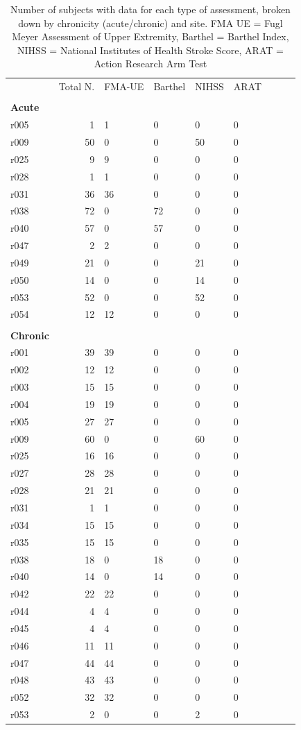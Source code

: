 \documentclass[10pt]{article}
\begin{document}
\begin{table}[h]
\centering
\caption{Number of subjects with data for each type of assessment, broken down by chronicity (acute/chronic) and site. FMA UE = Fugl Meyer Assessment of Upper Extremity, Barthel = Barthel Index, NIHSS = National Institutes of Health Stroke Score, ARAT = Action Research Arm Test}
\label{motor_scores}
\begin{tabular}{lrlllllll}
\toprule
 & Total N. & FMA-UE  & Barthel & NIHSS  & ARAT \\
 & & &  &  \\
 \textbf{Acute}  & & & & & \\
\midrule
r005 & 1 & 1 & 0 & 0 & 0 \\
r009 & 50 & 0 & 0 & 50 & 0 \\
r025 & 9 & 9 & 0 & 0 & 0 \\
r028 & 1 & 1 & 0 & 0 & 0 \\
r031 & 36 & 36 & 0 & 0 & 0 \\
r038 & 72 & 0 & 72 & 0 & 0 \\
r040 & 57 & 0 & 57 & 0 & 0 \\
r047 & 2 & 2 & 0 & 0 & 0 \\
r049 & 21 & 0 & 0 & 21 & 0 \\
r050 & 14 & 0 & 0 & 14 & 0 \\
r053 & 52 & 0 & 0 & 52 & 0 \\
r054 & 12 & 12 & 0 & 0 & 0 \\

& & & & & \\
 \textbf{Chronic}  & & & & & \\
\midrule
r001 & 39 & 39 & 0 & 0 & 0 \\
r002 & 12 & 12 & 0 & 0 & 0 \\
r003 & 15 & 15 & 0 & 0 & 0 \\
r004 & 19 & 19 & 0 & 0 & 0 \\
r005 & 27 & 27 & 0 & 0 & 0 \\
r009 & 60 & 0 & 0 & 60 & 0 \\
r025 & 16 & 16 & 0 & 0 & 0 \\
r027 & 28 & 28 & 0 & 0 & 0 \\
r028 & 21 & 21 & 0 & 0 & 0 \\
r031 & 1 & 1 & 0 & 0 & 0 \\
r034 & 15 & 15 & 0 & 0 & 0 \\
r035 & 15 & 15 & 0 & 0 & 0 \\
r038 & 18 & 0 & 18 & 0 & 0 \\
r040 & 14 & 0 & 14 & 0 & 0 \\
r042 & 22 & 22 & 0 & 0 & 0 \\
r044 & 4 & 4 & 0 & 0 & 0 \\
r045 & 4 & 4 & 0 & 0 & 0 \\
r046 & 11 & 11 & 0 & 0 & 0 \\
r047 & 44 & 44 & 0 & 0 & 0 \\
r048 & 43 & 43 & 0 & 0 & 0 \\
r052 & 32 & 32 & 0 & 0 & 0 \\
r053 & 2 & 0 & 0 & 2 & 0 \\
\bottomrule
\end{tabular}
\end{table}
\end{document}
